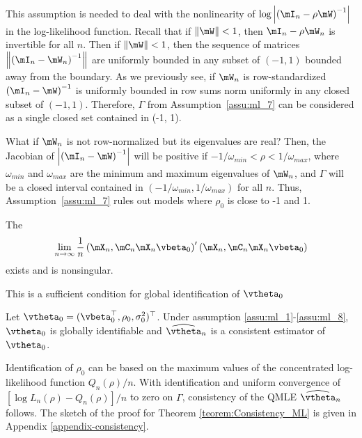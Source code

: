 \documentclass[english,12pt]{book}\usepackage[]{graphicx}\usepackage[]{xcolor}
\begin{document}
This assumption is needed to deal with the nonlinearity of $\log \left|\left(\mI_n - \rho \mW\right)^{-1}\right|$ in the log-likelihood function. Recall that if $\left\| \mW\right\| < 1$, then $\mI_n - \rho\mW_n$ is invertible for all $n$. Then if $\left\| \mW\right\| < 1$, then the sequence of matrices $\left\|\left(\mI_n- \mW_n\right)^{-1}\right\|$ are uniformly bounded in any subset of $(-1, 1)$ bounded away from the boundary. As we previously see, if $\mW_n$ is row-standardized $\left(\mI_n- \mW\right)^{-1}$ is uniformly bounded in row sums norm uniformly in any closed subset of $(-1, 1)$. Therefore, $\Gamma$ from Assumption~\ref{assu:ml_7} can be considered as a single closed set contained in (-1, 1).

What if $\mW_n$ is not row-normalized but its eigenvalues are real? Then, the Jacobian of $\left|\left(\mI_n- \mW\right)^{-1}\right|$ will be positive if $-1/\omega_{min} < \rho < 1/\omega_{max}$, where $\omega_{min}$ and $\omega_{max}$ are the minimum and maximum eigenvalues of $\mW_n$, and $\Gamma$ will be a closed interval contained in $(-1/\omega_{min}, 1/\omega_{max})$ for all $n$. Thus, Assumption~\ref{assu:ml_7} rules out models where $\rho_0$ is close to -1 and 1.  

\begin{assumption}\label{assu:ml_8}
		The
		\begin{equation*}
			\lim_{n\to \infty}\frac{1}{n}\left(\mX_n, \mC_n\mX_n\vbeta_0\right)'\left(\mX_n, \mC_n\mX_n\vbeta_0\right)
		\end{equation*}
		 exists and is nonsingular.
\end{assumption}

This is a sufficient condition for global identification of $\vtheta_0$

\begin{theorem}[Consistency]\label{teorem:Consistency_ML}
	Let $\vtheta_0 = (\vbeta_0^\top, \rho_0, \sigma_0^2)^\top$. Under assumption \ref{assu:ml_1}-\ref{assu:ml_8}, $\vtheta_0$ is globally identifiable and $\widehat{\vtheta}_n$ is a consistent estimator of $\vtheta_0$.
\end{theorem}

Identification of $\rho_0$ can be based on the maximum values of the concentrated log-likelihood function $Q_n(\rho) / n$. With identification and uniform convergence of $\left[\log L_n(\rho) - Q_n(\rho)\right] / n$ to zero on $\Gamma$, consistency of the QMLE $\widehat{\vtheta}_n$ follows. The sketch of the proof for Theorem \ref{teorem:Consistency_ML} is given in Appendix \ref{appendix-consistency}. 
\end{document}
